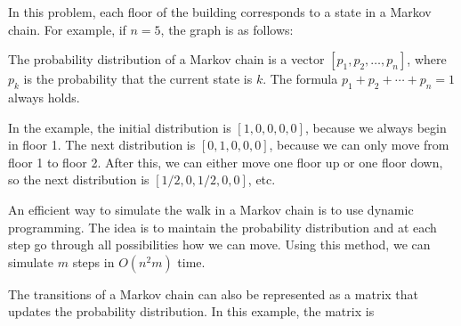In this problem, each floor of the building
corresponds to a state in a Markov chain.
For example, if $n=5$, the graph is as follows:

\begin{center}
\end{center}

The probability distribution
of a Markov chain is a vector
$[p_1,p_2,\ldots,p_n]$, where $p_k$ is the
probability that the current state is $k$.
The formula $p_1+p_2+\cdots+p_n=1$ always holds.

In the example, the initial distribution is
$[1,0,0,0,0]$, because we always begin in floor 1.
The next distribution is $[0,1,0,0,0]$,
because we can only move from floor 1 to floor 2.
After this, we can either move one floor up
or one floor down, so the next distribution is
$[1/2,0,1/2,0,0]$, etc.

An efficient way to simulate the walk in
a Markov chain is to use dynamic programming.
The idea is to maintain the probability distribution
and at each step go through all possibilities
how we can move.
Using this method, we can simulate $m$ steps
in $O(n^2 m)$ time.

The transitions of a Markov chain can also be
represented as a matrix that updates the
probability distribution.
In this example, the matrix is

